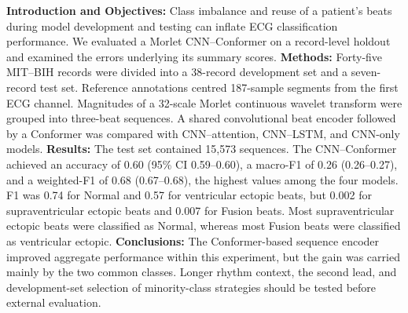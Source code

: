 \textbf{Introduction and Objectives:} Class imbalance and reuse of a patient's beats during model development and testing can inflate ECG classification performance. We evaluated a Morlet CNN--Conformer on a record-level holdout and examined the errors underlying its summary scores. \textbf{Methods:} Forty-five MIT--BIH records were divided into a 38-record development set and a seven-record test set. Reference annotations centred 187-sample segments from the first ECG channel. Magnitudes of a 32-scale Morlet continuous wavelet transform were grouped into three-beat sequences. A shared convolutional beat encoder followed by a Conformer was compared with CNN--attention, CNN--LSTM, and CNN-only models. \textbf{Results:} The test set contained 15{,}573 sequences. The CNN--Conformer achieved an accuracy of 0.60 (95\% CI 0.59--0.60), a macro-F1 of 0.26 (0.26--0.27), and a weighted-F1 of 0.68 (0.67--0.68), the highest values among the four models. F1 was 0.74 for Normal and 0.57 for ventricular ectopic beats, but 0.002 for supraventricular ectopic beats and 0.007 for Fusion beats. Most supraventricular ectopic beats were classified as Normal, whereas most Fusion beats were classified as ventricular ectopic. \textbf{Conclusions:} The Conformer-based sequence encoder improved aggregate performance within this experiment, but the gain was carried mainly by the two common classes. Longer rhythm context, the second lead, and development-set selection of minority-class strategies should be tested before external evaluation.
